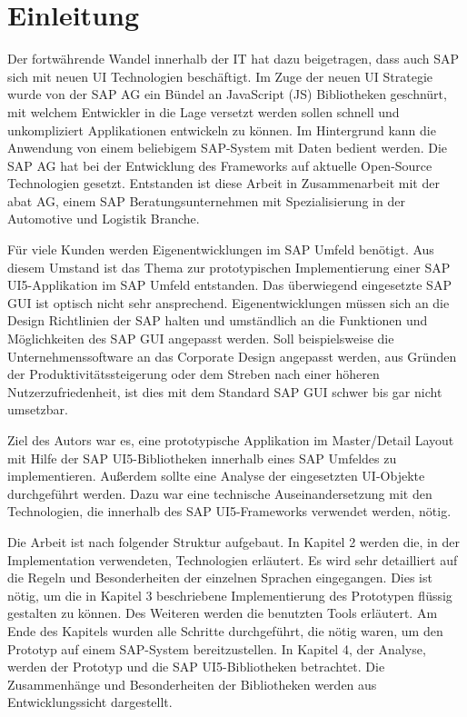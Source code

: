 \section{Einleitung}\label{einleitung}
Der fortwährende Wandel innerhalb der IT hat dazu beigetragen, dass auch SAP sich mit neuen UI Technologien beschäftigt. Im Zuge der neuen UI Strategie wurde von der SAP AG ein Bündel an JavaScript (JS) Bibliotheken geschnürt, mit welchem Entwickler in die Lage versetzt werden sollen schnell und unkompliziert Applikationen entwickeln zu können. Im Hintergrund kann die Anwendung von einem beliebigem SAP-System mit Daten bedient werden. Die SAP AG hat bei der Entwicklung des Frameworks auf aktuelle Open-Source Technologien gesetzt. Entstanden ist diese Arbeit in Zusammenarbeit mit der abat AG, einem SAP Beratungsunternehmen mit Spezialisierung in der Automotive und Logistik Branche.\par Für viele Kunden werden Eigenentwicklungen im SAP Umfeld benötigt. Aus diesem Umstand ist das Thema zur prototypischen Implementierung einer SAP UI5-Applikation im SAP Umfeld entstanden. Das überwiegend eingesetzte SAP GUI ist optisch nicht sehr ansprechend. Eigenentwicklungen müssen sich an die Design Richtlinien der SAP halten und umständlich an die Funktionen und Möglichkeiten des SAP GUI angepasst werden. Soll beispielsweise die Unternehmenssoftware an das Corporate Design angepasst werden, aus Gründen der Produktivitätssteigerung oder dem Streben nach einer höheren Nutzerzufriedenheit, ist dies mit dem Standard SAP GUI schwer bis gar nicht umsetzbar.\par Ziel des Autors war es, eine prototypische Applikation im Master/Detail Layout mit Hilfe der SAP UI5-Bibliotheken innerhalb eines SAP Umfeldes zu implementieren. Außerdem sollte eine Analyse der eingesetzten UI-Objekte durchgeführt werden. Dazu war eine technische Auseinandersetzung mit den Technologien, die innerhalb des SAP UI5-Frameworks verwendet werden, nötig.\par Die Arbeit ist nach folgender Struktur aufgebaut. In Kapitel 2 werden die, in der Implementation verwendeten, Technologien erläutert. Es wird sehr detailliert auf die Regeln und Besonderheiten der einzelnen Sprachen eingegangen. Dies ist nötig, um die in Kapitel 3 beschriebene Implementierung des Prototypen flüssig gestalten zu können. Des Weiteren werden die benutzten Tools erläutert. Am Ende des Kapitels wurden alle Schritte durchgeführt, die nötig waren, um den Prototyp auf einem SAP-System bereitzustellen. In Kapitel 4, der Analyse, werden der Prototyp und die SAP UI5-Bibliotheken betrachtet. Die Zusammenhänge und Besonderheiten der Bibliotheken werden aus Entwicklungssicht dargestellt.